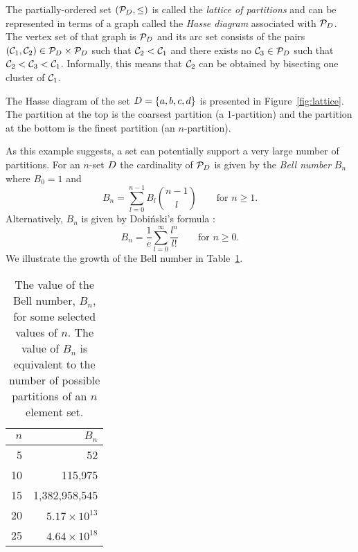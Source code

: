 The partially-ordered set $(\mathcal{P}_{D},\leq)$ is called the
\textit{lattice of partitions} and can be represented in terms of a graph
called the \textit{Hasse diagram} associated with $\mathcal{P}_{D}$.  The
vertex set of that graph is $\mathcal{P}_{D}$ and its arc set consists of the
pairs $(\mathcal{C}_1,\mathcal{C}_2) \in \mathcal{P}_{D} \times \mathcal{P}_{D}$ such that
$\mathcal{C}_2 < \mathcal{C}_1$ and there exists no $\mathcal{C}_3 \in \mathcal{P}_{D}$ such that
$\mathcal{C}_2 < \mathcal{C}_3 < \mathcal{C}_1$.  Informally, this means that $\mathcal{C}_2$ can be
obtained by bisecting one cluster of $\mathcal{C}_1$.

The Hasse diagram of the set $D = \{a,b,c,d\}$ is presented in
Figure~\ref{fig:lattice}.  The partition at the top is the coarsest partition
(a 1-partition) and the partition at the bottom is the finest partition (an
$n$-partition).

As this example suggests, a set can potentially support a very large number of
partitions.  For an $n$-set $D$ the cardinality of $\mathcal{P}_{D}$ is
given by the \textit{Bell number} $B_n$
\citep{bell1934exponential,stanley2000enumerative} where $B_0=1$ and
\begin{equation*}
  B_n = \sum_{l=0}^{n-1} B_l \binom{n-1}{l} \qquad \text{for $n \geq 1$}.
\end{equation*}
Alternatively, $B_n$ is given by Dobi\'{n}ski's formula
\citep{dobinski1877summation}:
\begin{equation*}
  B_n = \frac{1}{e} \sum_{l=0}^{\infty} \frac{l^n}{l!} \qquad \text{for $n
    \geq 0$}.
\end{equation*}
We illustrate the growth of the Bell number in Table~\ref{tab:bell-number}.

\begin{table}
  \centering
  \begin{tabular}{rr}
    \toprule
    $n$ & $B_n$ \\
    \midrule
    5 & 52 \\
    10 & 115,975 \\
    15 & 1,382,958,545 \\
    20 & $5.17 \times 10^{13}$ \\
    25 & $4.64 \times 10^{18}$ \\
    \bottomrule
  \end{tabular}
  \caption{The value of the Bell number, $B_n$, for some selected values of
    $n$.  The value of $B_n$ is equivalent to the number of possible
    partitions of an $n$ element set.}
  \label{tab:bell-number}
\end{table}

